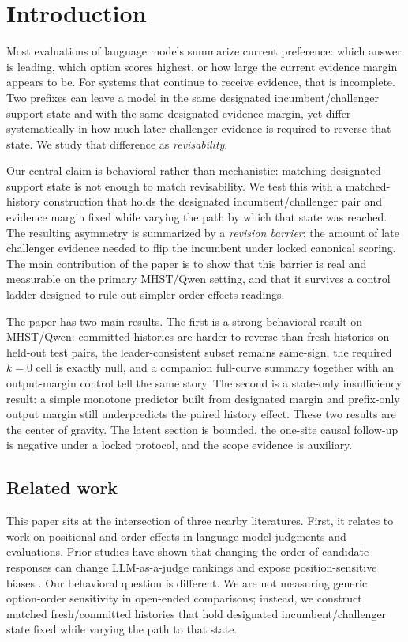 \section{Introduction}

Most evaluations of language models summarize current preference: which answer is leading, which option scores highest, or how large the current evidence margin appears to be. For systems that continue to receive evidence, that is incomplete. Two prefixes can leave a model in the same designated incumbent/challenger support state and with the same designated evidence margin, yet differ systematically in how much later challenger evidence is required to reverse that state. We study that difference as \emph{revisability}.

Our central claim is behavioral rather than mechanistic: matching designated support state is not enough to match revisability. We test this with a matched-history construction that holds the designated incumbent/challenger pair and evidence margin fixed while varying the path by which that state was reached. The resulting asymmetry is summarized by a \emph{revision barrier}: the amount of late challenger evidence needed to flip the incumbent under locked canonical scoring. The main contribution of the paper is to show that this barrier is real and measurable on the primary MHST/Qwen setting, and that it survives a control ladder designed to rule out simpler order-effects readings.

The paper has two main results. The first is a strong behavioral result on MHST/Qwen: committed histories are harder to reverse than fresh histories on held-out test pairs, the leader-consistent subset remains same-sign, the required $k{=}0$ cell is exactly null, and a companion full-curve summary together with an output-margin control tell the same story. The second is a state-only insufficiency result: a simple monotone predictor built from designated margin and prefix-only output margin still underpredicts the paired history effect. These two results are the center of gravity. The latent section is bounded, the one-site causal follow-up is negative under a locked protocol, and the scope evidence is auxiliary.

\subsection{Related work}

This paper sits at the intersection of three nearby literatures. First, it relates to work on positional and order effects in language-model judgments and evaluations. Prior studies have shown that changing the order of candidate responses can change LLM-as-a-judge rankings and expose position-sensitive biases \citep{wang2023fair,zheng2023judging}. Our behavioral question is different. We are not measuring generic option-order sensitivity in open-ended comparisons; instead, we construct matched fresh/committed histories that hold designated incumbent/challenger state fixed while varying the path to that state.

